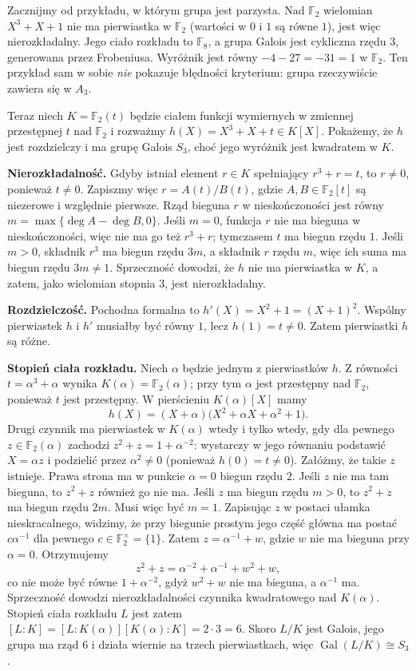 \begin{przyklad}\label{aa:prz:disc-char2}
Zacznijmy od przykładu, w którym grupa jest parzysta.
Nad $\mathbb F_2$ wielomian $X^3+X+1$ nie ma
pierwiastka w $\mathbb F_2$ (wartości w $0$ i $1$
są równe $1$), jest więc nierozkładalny.
Jego ciało rozkładu to $\mathbb F_8$, a grupa Galois
jest cykliczna rzędu $3$, generowana przez Frobeniusa.
Wyróżnik jest równy $-4-27=-31=1$ w $\mathbb F_2$.
Ten przykład sam w sobie \emph{nie} pokazuje błędności
kryterium: grupa rzeczywiście zawiera się w $A_3$.

Teraz niech $K=\mathbb F_2(t)$ będzie ciałem funkcji
wymiernych w zmiennej przestępnej $t$ nad $\mathbb F_2$
i rozważmy $h(X)=X^3+X+t\in K[X]$.
Pokażemy, że $h$ jest rozdzielczy i ma grupę Galois $S_3$,
choć jego wyróżnik jest kwadratem w $K$.

\textbf{Nierozkładalność.}
Gdyby istniał element $r\in K$ spełniający $r^3+r=t$,
to $r\ne0$, ponieważ $t\ne0$. Zapiszmy więc $r=A(t)/B(t)$,
gdzie $A,B\in\mathbb F_2[t]$ są niezerowe
i względnie pierwsze.
Rząd bieguna $r$ w nieskończoności jest równy
$m=\max\{\deg A-\deg B,0\}$.
Jeśli $m=0$, funkcja $r$ nie ma bieguna w nieskończoności,
więc nie ma go też $r^3+r$; tymczasem $t$ ma biegun
rzędu $1$. Jeśli $m>0$, składnik $r^3$ ma biegun rzędu
$3m$, a składnik $r$ rzędu $m$, więc ich suma ma biegun
rzędu $3m\ne1$. Sprzeczność dowodzi, że $h$ nie ma
pierwiastka w $K$, a zatem, jako wielomian stopnia $3$,
jest nierozkładalny.

\textbf{Rozdzielczość.}
Pochodna formalna to $h'(X)=X^2+1=(X+1)^2$.
Wspólny pierwiastek $h$ i $h'$ musiałby być równy $1$,
lecz $h(1)=t\ne0$. Zatem pierwiastki $h$ są różne.

\textbf{Stopień ciała rozkładu.}
Niech $\alpha$ będzie jednym z pierwiastków $h$.
Z równości $t=\alpha^3+\alpha$ wynika
$K(\alpha)=\mathbb F_2(\alpha)$; przy tym $\alpha$
jest przestępny nad $\mathbb F_2$, ponieważ $t$ jest
przestępny. W pierścieniu $K(\alpha)[X]$ mamy
\[
 h(X)=(X+\alpha)
 \bigl(X^2+\alpha X+\alpha^2+1\bigr).
\]
Drugi czynnik ma pierwiastek w $K(\alpha)$
wtedy i tylko wtedy, gdy dla pewnego
$z\in\mathbb F_2(\alpha)$ zachodzi
$z^2+z=1+\alpha^{-2}$: wystarczy w jego równaniu
podstawić $X=\alpha z$ i podzielić przez
$\alpha^2\ne0$ (ponieważ $h(0)=t\ne0$).
Załóżmy, że takie $z$ istnieje. Prawa strona ma
w punkcie $\alpha=0$ biegun rzędu $2$.
Jeśli $z$ nie ma tam bieguna, to $z^2+z$ również
go nie ma. Jeśli $z$ ma biegun rzędu $m>0$,
to $z^2+z$ ma biegun rzędu $2m$. Musi więc być
$m=1$. Zapisując $z$ w postaci ułamka nieskracalnego,
widzimy, że przy biegunie prostym jego część główna
ma postać $c\alpha^{-1}$ dla pewnego
$c\in\mathbb F_2^\times=\{1\}$.
Zatem $z=\alpha^{-1}+w$, gdzie $w$ nie ma bieguna
przy $\alpha=0$. Otrzymujemy
\[
 z^2+z=\alpha^{-2}+\alpha^{-1}+w^2+w,
\]
co nie może być równe $1+\alpha^{-2}$, gdyż
$w^2+w$ nie ma bieguna, a $\alpha^{-1}$ ma.
Sprzeczność dowodzi nierozkładalności czynnika
kwadratowego nad $K(\alpha)$.
Stopień ciała rozkładu $L$ jest zatem
$[L:K]=[L:K(\alpha)][K(\alpha):K]=2\cdot3=6$.
Skoro $L/K$ jest Galois, jego grupa ma rząd $6$
i działa wiernie na trzech pierwiastkach, więc
$\operatorname{Gal}(L/K)\cong S_3$.


\end{przyklad}
